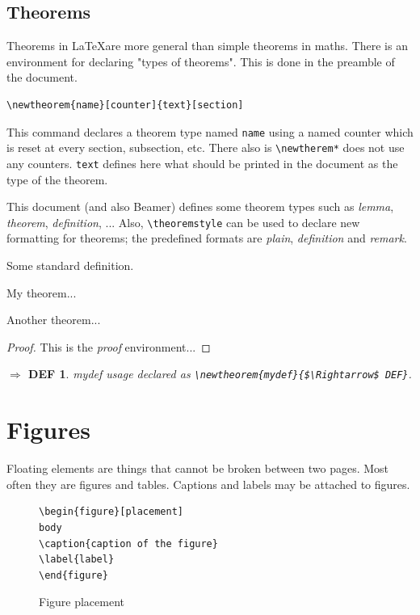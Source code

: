 \subsection{Theorems}

Theorems in \LaTeX are more general than simple theorems in maths.
There is an environment for declaring "types of theorems".
This is done in the preamble of the document.
\begin{lstlisting}
\newtheorem{name}[counter]{text}[section]
\end{lstlisting}
This command declares a theorem type named \texttt{name} using a named counter
which is reset at every section, subsection, etc.
There also is \lstinline!\newtherem*! does not use any counters.
\texttt{text} defines here what should be printed in the document as the type of
the theorem.

This document (and also Beamer) defines some theorem types such as
\textit{lemma}, \textit{theorem}, \textit{definition}, ...
Also, \lstinline!\theoremstyle! can be used to declare new formatting for
theorems; the predefined formats are \textit{plain}, \textit{definition} and
\textit{remark}.

\begin{definition}
Some standard definition.
\end{definition}

\begin{theorem}
My theorem...
\end{theorem}
\begin{theorem}
Another theorem...
\begin{proof}
This is the \emph{proof} environment...
\end{proof}
\end{theorem}

\newtheorem{mydef}{$\Rightarrow$ DEF}
\begin{mydef}
mydef usage declared as \lstinline!\newtheorem{mydef}{$\Rightarrow$ DEF}!.
\end{mydef}

\section{Figures}

Floating elements are things that cannot be broken between two pages.
Most often they are figures and tables.
Captions and labels may be attached to figures.

\begin{figure}[H]
\centering
\begin{lstlisting}
\begin{figure}[placement]
body
\caption{caption of the figure}
\label{label}
\end{figure}
\end{lstlisting}
\caption{Figure placement}
\label{fig:figure-placement}
\end{figure}

